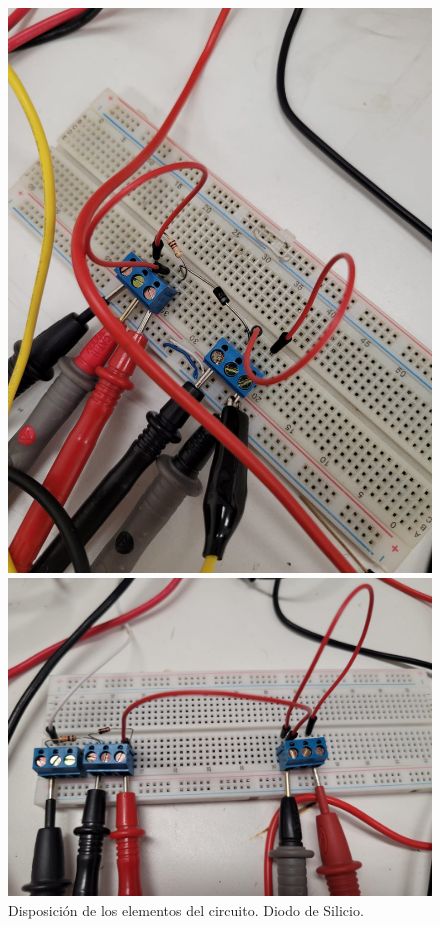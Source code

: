 \documentclass[chaptersright]{informeutn}
\begin{document}
      \begin{figure}[h!]
        \centering
        \begin{minipage}{0.40\textwidth}
            \centering
            \includegraphics[width=\textwidth]{pictures/disposicion-circuito-silicio.jpeg}
            \caption{Disposición de los elementos del circuito. Diodo de Silicio.}
            \label{fig:silicio}
        \end{minipage}
        \hspace{0.05\textwidth} %
        \begin{minipage}{0.5\textwidth}
            \centering
            \includegraphics[width=\textwidth]{pictures/disposicion-circuito-germanio.jpeg}

\end{minipage}
\end{figure}
\end{document}

